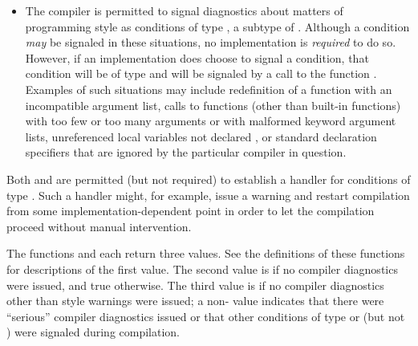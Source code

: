 \begin{newer}
\begin{itemize}
\item  The compiler is permitted to signal diagnostics about matters of
        programming style as conditions of type , a subtype
    of .  Although 
        a  condition {\it may} be signaled in these situations, no 
        implementation is {\it required} to do so.  However, if an 
        implementation does choose to signal a condition, that condition 
        will be of type  and will be signaled by a call to 
        the function .
        Examples of such situations may include
            redefinition of a function with an incompatible argument list,
            calls to functions (other than built-in functions)
                with too few or too many arguments
                or with malformed keyword argument lists,
            unreferenced local variables not declared , or
            standard declaration specifiers that are ignored by 
                the particular compiler in question.
\end{itemize}

Both  and  are permitted (but not
    required) to establish a handler for conditions of type .
    Such a handler
    might, for example, issue a warning and restart compilation from some
    implementation-dependent point in order to let the compilation
    proceed without manual intervention.

The functions  and  each return three values.
See the definitions of these functions for descriptions of the first value.
    The second value is  if no compiler diagnostics were issued, and
    true otherwise.
    The third value is  if no compiler diagnostics other than style
    warnings were issued; a non- value indicates that there were 
    ``serious'' compiler diagnostics issued or that other conditions of
    type  or  (but not ) were signaled during
    compilation.
\end{newer}

